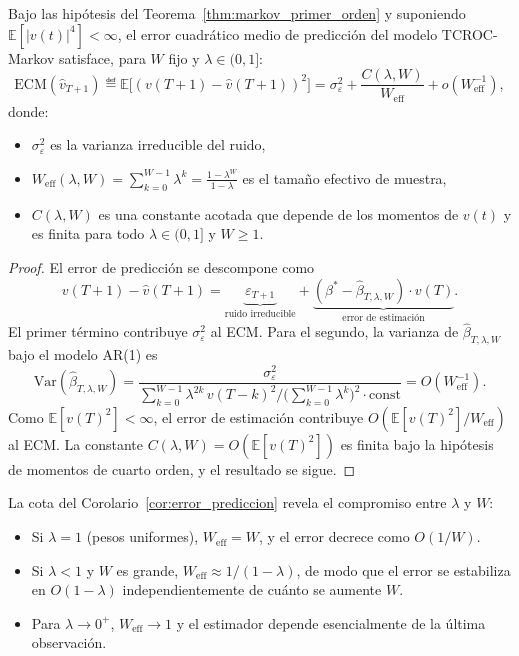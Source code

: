 \begin{corollary}
\label{cor:error_prediccion}
Bajo las hipótesis del Teorema~\ref{thm:markov_primer_orden} y
suponiendo $\mathbb{E}[|v(t)|^4] < \infty$, el error cuadrático
medio de predicción del modelo TCROC-Markov satisface, para $W$
fijo y $\lambda \in (0,1]$:
\[
\mathrm{ECM}(\hat{v}_{T+1})
\eqdef \mathbb{E}\bigl[(v(T+1) - \hat{v}(T+1))^2\bigr]
= \sigma_\varepsilon^2
  + \frac{C(\lambda,W)}{W_{\mathrm{eff}}} + o(W_{\mathrm{eff}}^{-1}),
\]
donde:
\begin{itemize}
  \item $\sigma_\varepsilon^2$ es la varianza irreducible del ruido,
  \item $W_{\mathrm{eff}}(\lambda, W)
        = \sum_{k=0}^{W-1} \lambda^k
        = \frac{1 - \lambda^W}{1 - \lambda}$
        es el tamaño efectivo de muestra,
  \item $C(\lambda, W)$ es una constante acotada que depende de los
        momentos de $v(t)$ y es finita para todo
        $\lambda \in (0,1]$ y $W \geq 1$.
\end{itemize}
\end{corollary}

\begin{proof}
El error de predicción se descompone como
\[
v(T+1) - \hat{v}(T+1)
= \underbrace{\varepsilon_{T+1}}_{\text{ruido irreducible}}
+ \underbrace{(\beta^* - \hat{\beta}_{T,\lambda,W})
  \cdot v(T)}_{\text{error de estimación}}.
\]
El primer término contribuye $\sigma_\varepsilon^2$ al ECM.  Para el
segundo, la varianza de $\hat{\beta}_{T,\lambda,W}$ bajo el modelo
AR(1) es
\[
\mathrm{Var}(\hat{\beta}_{T,\lambda,W})
= \frac{\sigma_\varepsilon^2}{\sum_{k=0}^{W-1}
  \lambda^{2k}\, v(T-k)^2 / \bigl(\sum_{k=0}^{W-1}
  \lambda^k\bigr)^2 \cdot \mathrm{const}}
= O(W_{\mathrm{eff}}^{-1}).
\]
Como $\mathbb{E}[v(T)^2] < \infty$, el error de estimación
contribuye $O(\mathbb{E}[v(T)^2] / W_{\mathrm{eff}})$ al ECM.
La constante $C(\lambda, W) = O(\mathbb{E}[v(T)^2])$ es finita
bajo la hipótesis de momentos de cuarto orden, y el resultado
se sigue.
\end{proof}

\begin{remark}
\label{rem:efecto_lambda}
La cota del Corolario~\ref{cor:error_prediccion} revela el
compromiso entre $\lambda$ y $W$:
\begin{itemize}
  \item Si $\lambda = 1$ (pesos uniformes),
    $W_{\mathrm{eff}} = W$, y el error decrece como $O(1/W)$.
  \item Si $\lambda < 1$ y $W$ es grande,
    $W_{\mathrm{eff}} \approx 1/(1-\lambda)$, de modo que el
    error se estabiliza en $O(1-\lambda)$ independientemente
    de cuánto se aumente $W$.
  \item Para $\lambda \to 0^+$, $W_{\mathrm{eff}} \to 1$ y el
    estimador depende esencialmente de la última observación.
\end{itemize}
\end{remark}

